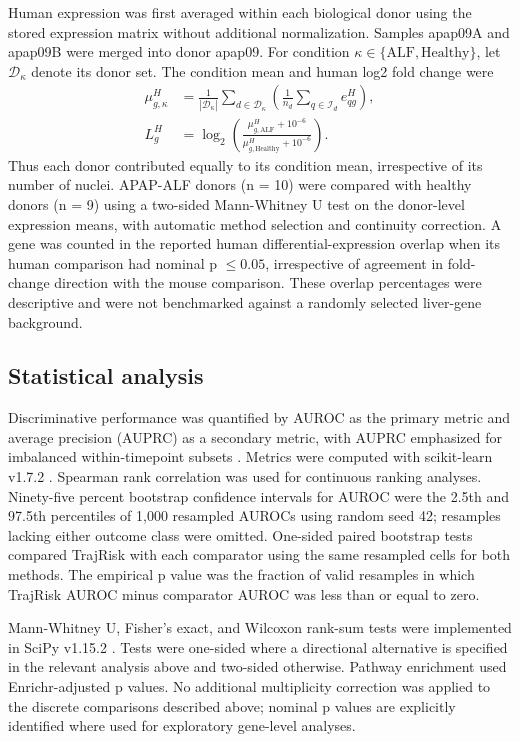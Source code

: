 Human expression was first averaged within each biological donor using the stored expression matrix without additional normalization. Samples apap09A and apap09B were merged into donor apap09. For condition \(\kappa\in\{\mathrm{ALF},\mathrm{Healthy}\}\), let \(\mathcal D_\kappa\) denote its donor set. The condition mean and human log2 fold change were
\begin{equation}\label{eq:human-fold-change}
\begin{aligned}
\mu_{g,\kappa}^{H}&=\frac{1}{|\mathcal D_\kappa|}
\sum_{d\in\mathcal D_\kappa}\left(\frac{1}{n_d}\sum_{q\in\mathcal I_d}e_{qg}^{H}\right),\\
L_g^{H}&=\log_2\!\left(
\frac{\mu_{g,\mathrm{ALF}}^{H}+10^{-6}}
{\mu_{g,\mathrm{Healthy}}^{H}+10^{-6}}\right).
\end{aligned}
\end{equation}
Thus each donor contributed equally to its condition mean, irrespective of its number of nuclei. APAP-ALF donors (n = 10) were compared with healthy donors (n = 9) using a two-sided Mann-Whitney U test on the donor-level expression means, with automatic method selection and continuity correction. A gene was counted in the reported human differential-expression overlap when its human comparison had nominal p \(\leq0.05\), irrespective of agreement in fold-change direction with the mouse comparison. These overlap percentages were descriptive and were not benchmarked against a randomly selected liver-gene background.

\subsection*{Statistical analysis}

Discriminative performance was quantified by AUROC as the primary metric and average precision (AUPRC) as a secondary metric, with AUPRC emphasized for imbalanced within-timepoint subsets \cite{ref126}. Metrics were computed with scikit-learn v1.7.2 \cite{ref117}. Spearman rank correlation was used for continuous ranking analyses. Ninety-five percent bootstrap confidence intervals for AUROC were the 2.5th and 97.5th percentiles of 1,000 resampled AUROCs using random seed 42; resamples lacking either outcome class were omitted. One-sided paired bootstrap tests compared TrajRisk with each comparator using the same resampled cells for both methods. The empirical p value was the fraction of valid resamples in which TrajRisk AUROC minus comparator AUROC was less than or equal to zero.

Mann-Whitney U, Fisher's exact, and Wilcoxon rank-sum tests were implemented in SciPy v1.15.2 \cite{ref122}. Tests were one-sided where a directional alternative is specified in the relevant analysis above and two-sided otherwise. Pathway enrichment used Enrichr-adjusted p values. No additional multiplicity correction was applied to the discrete comparisons described above; nominal p values are explicitly identified where used for exploratory gene-level analyses.
